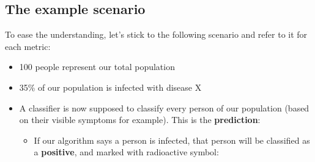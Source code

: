 \documentclass[12pt,a4paper]{article}
\begin{document}
\subsection*{The example scenario}
To ease the understanding, let's stick to the following scenario and refer to it for each metric:
\begin{itemize}
\item 100 people represent our total population
\item 35\% of our population is infected with disease X
\item A classifier is now supposed to classify every person of our population (based on their visible symptoms for example). This is the \textbf{prediction}:
\begin{itemize}
\item If our algorithm says a person is infected, that person will be classified as a \colorbox{pGreen}{\textbf{positive}}, and marked with radioactive symbol:
\end{itemize}
\end{itemize}
\end{document}
